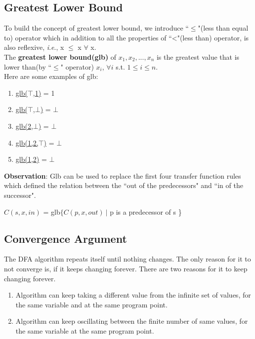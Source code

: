 \subsection{Greatest Lower Bound}
To build the concept of greatest lower bound, we introduce ``$\le$"(less than equal to) operator which in addition to all the properties of ``\textless"(less than) operator, is also reflexive, \textit{i}.\textit{e}., x $\le$ x $\forall$ x.\\
The \textbf{greatest lower bound(glb)} of $x_1, x_2, ..., x_n$ is the greatest value that is lower than(by ``$\le$" operator)  $x_i$, $\forall i$ s.t. $1 \le i \le n$.\\
Here are some examples of glb:
\begin{enumerate}
    \item \underline{glb($\top$,1)} = 1
    \item \underline{glb($\top$,$\bot$)} = $\bot$
    \item \underline{glb(2,$\bot$)} = $\bot$
    \item \underline{glb(1,2,$\top$)} = $\bot$
    \item \underline{glb(1,2)} = $\bot$
\end{enumerate}

\textbf{Observation}: Glb can be used to replace the first four transfer function rules which defined the relation between the ``out of the predecessors" and ``in of the successor".
\begin{center}
    $C(s,x,in)$ = glb$\{C(p,x,out)\ |$ p is a predecessor of s \}
\end{center}

\subsection{Convergence Argument}

The DFA algorithm repeats itself until nothing changes. The only reason for it to not converge is, if it keeps changing forever. There are two reasons for it to keep changing forever.
\begin{enumerate}
    \item Algorithm can keep taking a different value from the infinite set of values, for the same variable and at the same program point.
    \item Algorithm can keep oscillating between the finite number of same values, for the same variable at the same program point.
\end{enumerate}

